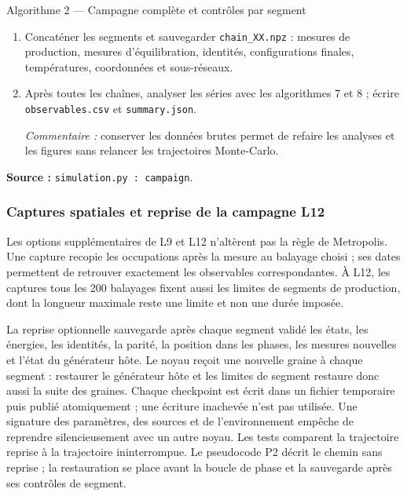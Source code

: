 \documentclass[10pt,a4paper]{article}
\begin{document}
\begin{algocode}{Algorithme 2 --- Campagne complète et contrôles par segment}
\begin{enumerate}
\begin{enumerate}
les compteurs d'acceptation locale et d'échange. Augmenter \texttt{done} de $S$.
\par\textit{Commentaire :} les mesures initiales servent aux historiques
mais n'entrent pas dans les moyennes thermiques. Le passage à la production
continue avec les configurations atteintes, sans nouvelle initialisation.
\end{enumerate}
\item Concaténer les segments et sauvegarder \texttt{chain\_XX.npz} :
mesures de production, mesures d'équilibration, identités, configurations
finales, températures, coordonnées et sous-réseaux.
\item Après toutes les chaînes, analyser les séries avec les algorithmes 7
et 8 ; écrire \texttt{observables.csv} et \texttt{summary.json}.
\par\textit{Commentaire :} conserver les données brutes permet de refaire
les analyses et les figures sans relancer les trajectoires Monte-Carlo.
\end{enumerate}
\textbf{Source :} \texttt{simulation.py : campaign}.
\end{algocode}

\subsubsection*{Captures spatiales et reprise de la campagne L12}
Les options supplémentaires de L9 et L12 n'altèrent pas la règle
de Metropolis. Une capture recopie les occupations après la mesure au
balayage choisi ; ses dates permettent de retrouver exactement les
observables correspondantes. À L12, les captures tous les 200 balayages
fixent aussi les limites de segments de production, dont la longueur
maximale reste une limite et non une durée imposée.

La reprise optionnelle sauvegarde après chaque segment validé les états,
les énergies, les identités, la parité, la position dans les phases,
les mesures nouvelles et l'état du générateur hôte. Le noyau reçoit
une nouvelle graine à chaque segment : restaurer le générateur hôte
et les limites de segment restaure donc aussi la suite des graines.
Chaque checkpoint est écrit dans un fichier temporaire puis publié
atomiquement ; une écriture inachevée n'est pas utilisée. Une signature
des paramètres, des sources et de l'environnement empêche de reprendre
silencieusement avec un autre noyau. Les tests comparent la trajectoire
reprise à la trajectoire ininterrompue. Le pseudocode P2 décrit le chemin
sans reprise ; la restauration se place avant la boucle de phase et
la sauvegarde après ses contrôles de segment.
\end{document}
